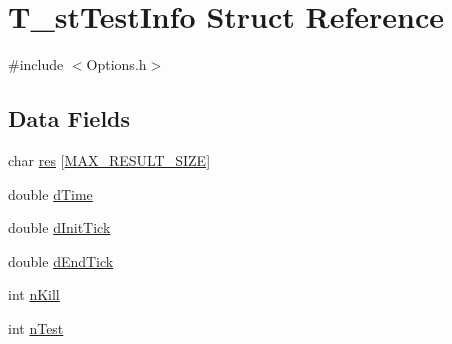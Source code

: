 \hypertarget{structT__stTestInfo}{\section{T\-\_\-st\-Test\-Info Struct Reference}
\label{structT__stTestInfo}
}


{\ttfamily \#include $<$Options.\-h$>$}

\subsection*{Data Fields}
\begin{DoxyCompactItemize}
\item 
char \hyperlink{structT__stTestInfo_aa38c547822e2dc65413e36b01a0c146b}{res} \mbox{[}\hyperlink{Options_8h_ae9b9a76449e4c445a7462cedf31b5805}{M\-A\-X\-\_\-\-R\-E\-S\-U\-L\-T\-\_\-\-S\-I\-Z\-E}\mbox{]}
\item 
double \hyperlink{structT__stTestInfo_a5e5ce59f759e44a4c770bc9aec9becd9}{d\-Time}
\item 
double \hyperlink{structT__stTestInfo_abab4bc2b273e308f14654bdfc92374ef}{d\-Init\-Tick}
\item 
double \hyperlink{structT__stTestInfo_ad07fd2d330a0aaaaf7b10e5fb6e09d98}{d\-End\-Tick}
\item 
int \hyperlink{structT__stTestInfo_a8252b126792e879c5b724f13e3ea7c44}{n\-Kill}
\item 
int \hyperlink{structT__stTestInfo_a31008dedf18028d566bb3f3b4732d817}{n\-Test}
\end{DoxyCompactItemize}


